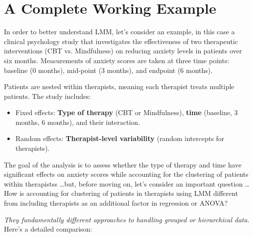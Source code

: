 \section{A Complete Working Example}
In order to better understand LMM, let's consider an example, in this case a clinical psychology study that investigates the effectiveness of two therapeutic interventions (CBT vs. Mindfulness) on reducing anxiety levels in patients over six months. Measurements of anxiety scores are taken at three time points: baseline (0 months), mid-point (3 months), and endpoint (6 months).

Patients are nested within therapists, meaning each therapist treats multiple patients. The study includes:
\begin{itemize}
\item Fixed effects: \textbf{Type of therapy} (CBT or Mindfulness), \textbf{time} (baseline, 3 months, 6 months), and their interaction.

\item Random effects: \textbf{Therapist-level variability} (random intercepts for therapists).
\end{itemize}

The goal of the analysis is to assess whether the type of therapy and time have significant effects on anxiety scores while accounting for the clustering of patients within therapistss \dots but, before moving on, let's consider an important question \dots How is accounting for clustering of patients in therapists using LMM different from including therapists as an additional factor in regression or ANOVA? 
\vspace{.2cm}

\noindent \textit{They fundamentally different approaches to handling grouped or hierarchical data.} Here’s a detailed comparison:

